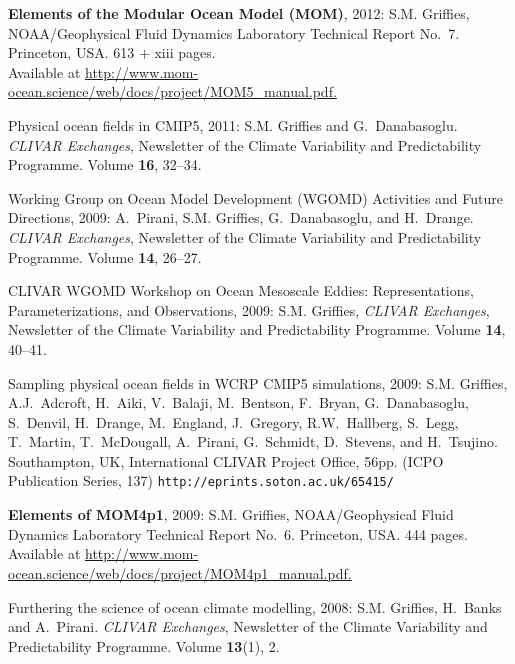 \begin{etaremune}
\item {\bf Elements of the Modular Ocean Model (MOM)}, 2012: S.M. Grif\/f\/ies, NOAA/Geophysical Fluid Dynamics Laboratory Technical Report No.\ 7. Princeton, USA.  613 + xiii pages. \\
  Available at 
  \href{http://www.mom-ocean.science/web/docs/project/MOM5_manual.pdf}{http://www.mom-ocean.science/web/docs/project/MOM5\_manual.pdf.}

\item Physical ocean fields in CMIP5, 2011:  S.M. Grif\/f\/ies and G.\ Danabasoglu. {\em CLIVAR Exchanges}, Newsletter of the Climate Variability and Predictability Programme.  Volume {\bf 16}, 32--34.

\item Working Group on Ocean Model Development (WGOMD) Activities and Future Directions, 2009: A.\ Pirani, S.M. Grif\/f\/ies, G.\ Danabasoglu, and H.\ Drange.  {\em CLIVAR Exchanges}, Newsletter of the Climate Variability and Predictability Programme.  Volume {\bf 14}, 26--27.

\item CLIVAR WGOMD Workshop on Ocean Mesoscale Eddies:
  Representations, Parameterizations, and Observations, 2009: S.M. Grif\/f\/ies, {\em CLIVAR Exchanges}, Newsletter of the Climate Variability and Predictability Programme.  Volume {\bf 14}, 40--41.

\item Sampling physical ocean fields in WCRP CMIP5 simulations, 2009: S.M. Grif\/f\/ies, A.J.\ Adcroft, H.\ Aiki, V.\ Balaji, M.\ Bentson, F.\ Bryan, G.\ Danabasoglu, S.\ Denvil, H.\ Drange, M.\ England, J.\ Gregory, R.W.\ Hallberg, S.\ Legg, T.\ Martin, T.\ McDougall, A.\ Pirani, G.\ Schmidt, D.\ Stevens, and H.\ Tsujino. Southampton, UK, International CLIVAR Project Office, 56pp. (ICPO
  Publication Series, 137) {\tt http://eprints.soton.ac.uk/65415/}

\item {\bf Elements of MOM4p1}, 2009: S.M. Grif\/f\/ies,
  NOAA/Geophysical Fluid Dynamics Laboratory Technical Report No.\ 6. Princeton, USA.  444 pages.  Available at \href{http://www.mom-ocean.science/web/docs/project/MOM4p1_manual.pdf}{http://www.mom-ocean.science/web/docs/project/MOM4p1\_manual.pdf.}
  
\item Furthering the science of ocean climate modelling, 2008: S.M. Grif\/f\/ies, H.\ Banks and A.\ Pirani.  {\em CLIVAR Exchanges}, Newsletter of the Climate Variability and Predictability Programme.  Volume {\bf 13}(1), 2.


\end{etaremune}
